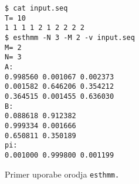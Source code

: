 \begin{figure}
\begin{verbatim}
$ cat input.seq 
T= 10
1 1 1 1 2 1 2 2 2 2
$ esthmm -N 3 -M 2 -v input.seq
M= 2
N= 3
A:
0.998560 0.001067 0.002373 
0.001582 0.646206 0.354212 
0.364515 0.001455 0.636030 
B:
0.088618 0.912382 
0.999334 0.001666 
0.650811 0.350189 
pi:
0.001000 0.999800 0.001199
\end{verbatim}
\caption{Primer uporabe orodja \tt{esthmm}.}
\label{fig:compare:umdhmm}
\end{figure}
